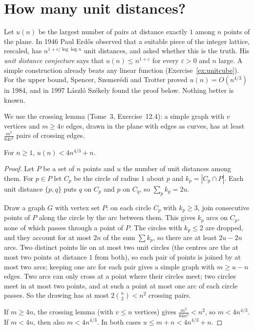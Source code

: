 \section{How many unit distances?}

Let $u(n)$ be the largest number of pairs at distance exactly $1$ among $n$ points of the plane. In 1946 Paul Erd\H os observed that a suitable piece of
the integer lattice, rescaled, has $n^{1+c/\log\log n}$ unit distances, and asked whether this is the truth. His \emph{unit distance conjecture} says
that $u(n)\le n^{1+\varepsilon}$ for every $\varepsilon>0$ and $n$ large. A simple construction already beats any linear function
(Exercise~\ref{ex:unitcube}). For the upper bound, Spencer, Szemer\'edi and Trotter proved $u(n)=O(n^{4/3})$ in 1984, and in 1997 L\'aszl\'o Sz\'ekely
found the proof below. Nothing better is known.

We use the crossing lemma (Tome~3, Exercise~12.4): a simple graph with $v$ vertices and $m\ge4v$ edges, drawn in the plane with edges as curves, has at
least $\frac{m^3}{64v^2}$ pairs of crossing edges.

\begin{theorem}\label{thm:unitdist}
For $n\ge1$, $u(n)<4n^{4/3}+n$.
\end{theorem}
\begin{proof}
Let $P$ be a set of $n$ points and $u$ the number of unit distances among them. For $p\in P$ let $C_p$ be the circle of radius $1$ about $p$ and
$k_p=|C_p\cap P|$. Each unit distance $\{p,q\}$ puts $q$ on $C_p$ and $p$ on $C_q$, so $\sum_pk_p=2u$.

Draw a graph $G$ with vertex set $P$: on each circle $C_p$ with $k_p\ge3$, join consecutive points of $P$ along the circle by the arc between them. This
gives $k_p$ arcs on $C_p$, none of which passes through a point of $P$. The circles with $k_p\le2$ are dropped, and they account for at most $2n$ of the
sum $\sum k_p$, so there are at least $2u-2n$ arcs. Two distinct points lie on at most two unit circles (the centres are the at most two points at
distance $1$ from both), so each pair of points is joined by at most two arcs; keeping one arc for each pair gives a simple graph with
$m\ge u-n$ edges. Two arcs can only cross at a point where their circles meet; two circles meet in at most two points, and at such a point at most one
arc of each circle passes. So the drawing has at most $2\binom n2<n^2$ crossing pairs.

If $m\ge4n$, the crossing lemma (with $v\le n$ vertices) gives $\frac{m^3}{64n^2}<n^2$, so $m<4n^{4/3}$. If $m<4n$, then also $m<4n^{4/3}$. In both cases
$u\le m+n<4n^{4/3}+n$.
\end{proof}


